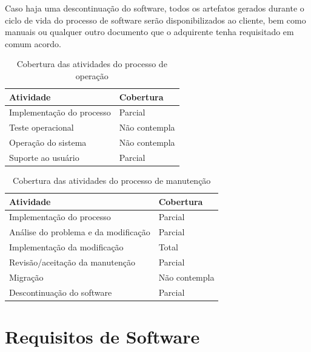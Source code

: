 Caso haja uma descontinuação do software, todos os artefatos gerados durante o ciclo de vida do processo de software serão disponibilizados ao cliente, bem como manuais ou qualquer outro documento que o adquirente tenha requisitado em comum acordo.

\begin{table}[htb]
      \begin{center}
        \begin{tabular}{| p{6cm} | l |}
        \hline
        \textbf{Atividade} & \textbf{Cobertura} \\ \hline
        Implementação do processo & Parcial \\ \hline
        Teste operacional & Não contempla \\ \hline
        Operação do sistema & Não contempla \\ \hline
        Suporte ao usuário & Parcial \\ \hline
        \end{tabular}
      \end{center}
    \caption{Cobertura das atividades do processo de operação}
    \end{table}

    \begin{table}[htb]
      \begin{center}
        \begin{tabular}{| p{6cm} | l |}
        \hline
        \textbf{Atividade} & \textbf{Cobertura} \\ \hline
        Implementação do processo & Parcial \\ \hline
        Análise do problema e da modificação & Parcial \\ \hline
        Implementação da modificação & Total\\ \hline
        Revisão/aceitação da manutenção & Parcial \\ \hline
        Migração & Não contempla \\ \hline
        Descontinuação do software & Parcial \\ \hline
        \end{tabular}
      \end{center}
    \caption{Cobertura das atividades do processo de manutenção}
    \end{table}

\section{Requisitos de Software}
\label{sec:requisitos}

